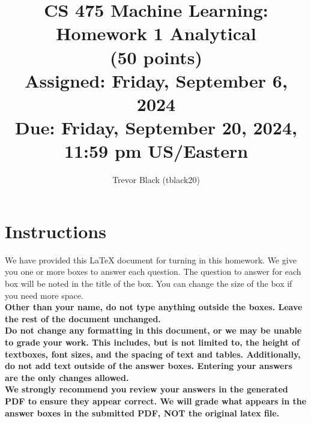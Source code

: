 \documentclass[11pt]{article}
\title{CS 475 Machine Learning: Homework 1 Analytical \\
(50 points)\\
\Large{Assigned: Friday, September 6, 2024} \\
\Large{Due: Friday, September 20, 2024, 11:59 pm US/Eastern}}
\author{Trevor Black (tblack20)}
\date{}
\renewcommand{\vec}[1]{\mathbf{#1}}
\begin{document}
\maketitle
\thispagestyle{headings}

\section*{Instructions }
We have provided this \LaTeX{} document for turning in this homework. We give you one or more boxes to answer each question.  The question to answer for each box will be noted in the title of the box.  You can change the size of the box if you need more space.\\

{\bf Other than your name, do not type anything outside the boxes. Leave the rest of the document unchanged.}\\


\textbf{Do not change any formatting in this document, or we may be unable to
  grade your work. This includes, but is not limited to, the height of
  textboxes, font sizes, and the spacing of text and tables.  Additionally, do
  not add text outside of the answer boxes. Entering your answers are the only
  changes allowed.}\\


\textbf{We strongly recommend you review your answers in the generated PDF to
  ensure they appear correct. We will grade what appears in the answer boxes in
  the submitted PDF, NOT the original latex file.}

\end{document}
